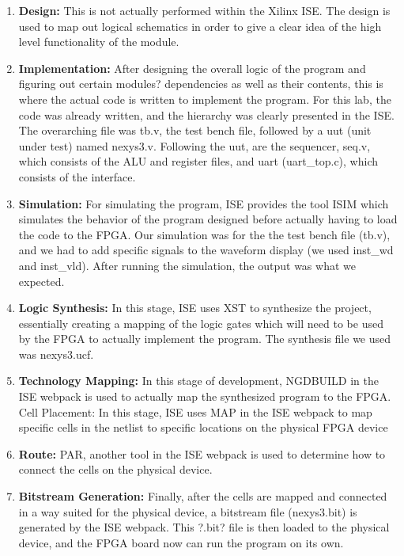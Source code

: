 \documentclass{article}
\begin{document}
\begin{enumerate}[label=\alph*]

\item \textbf{Design:} This is not actually performed within the Xilinx ISE.  The design is used to map out logical schematics in order to give a clear idea of the high level functionality of the module. 

\item \textbf{Implementation:} After designing the overall logic of the program and figuring out certain modules? dependencies as well as their contents, this is where the actual code is written to implement the program.  For this lab, the code was already written, and the hierarchy was clearly presented in the ISE.  The overarching file was tb.v, the test bench file, followed by a uut (unit under test) named nexys3.v.  Following the uut, are the sequencer, seq.v, which consists of the ALU and register files, and uart (uart\_top.c), which consists of the interface.

\item \textbf{Simulation:} For simulating the program, ISE provides the tool ISIM which simulates the behavior of the program designed before actually having to load the code to the FPGA.  Our simulation was for the the test bench file (tb.v), and we had to add specific signals to the waveform display (we used inst\_wd and inst\_vld).  After running the simulation, the output was what we expected. 

\item \textbf{Logic Synthesis:} In this stage, ISE uses XST to synthesize the project, essentially creating a mapping of the logic gates which will need to be used by the FPGA to actually implement the program.  The synthesis file we used was nexys3.ucf.

\item \textbf{Technology Mapping:} In this stage of development, NGDBUILD in the ISE webpack is used to actually map the synthesized program to the FPGA.
Cell Placement: In this stage, ISE uses MAP in the ISE webpack to map specific cells in the netlist to specific locations on the physical FPGA device

\item \textbf{Route:} PAR, another tool in the ISE webpack is used to determine how to connect the cells on the physical device.

\item \textbf{Bitstream Generation: } Finally, after the cells are mapped and connected in a way suited for the physical device, a bitstream file (nexys3.bit)  is generated by the ISE webpack.  This ?.bit? file is then loaded to the physical device, and the FPGA board now can run the program on its own.


\end{enumerate}
\end{document}
